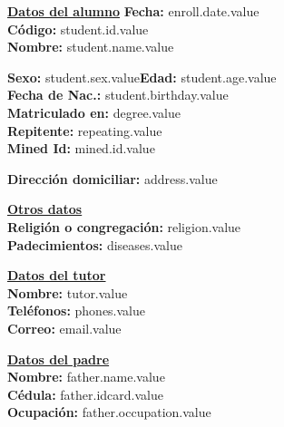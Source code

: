 \documentclass[12pt]{article}
\newcommand{\aField}[1]{#1}
\newcommand{\enrollDate}{enroll.date.value}
\newcommand{\studentName}{student.name.value}
\newcommand{\studentBirthday}{student.birthday.value}
\newcommand{\studentAge}{student.age.value}
\newcommand{\studentSex}{student.sex.value}
\newcommand{\isRepeating}{repeating.value}
\newcommand{\minedId}{mined.id.value}
\newcommand{\degree}{degree.value}
\newcommand{\address}{address.value}
\newcommand{\religion}{religion.value}
\newcommand{\diseases}{diseases.value}
\newcommand{\tutor}{tutor.value}
\newcommand{\phones}{phones.value}
\newcommand{\email}{email.value}
\newcommand{\fatherName}{father.name.value}
\newcommand{\fatherIdcard}{father.idcard.value}
\newcommand{\fatherOccupation}{father.occupation.value}
\newcommand{\studentId}{student.id.value}
\begin{document}
    \textbf{\uline{Datos del alumno}} \hfill \textbf{Fecha:} \enrollDate\\[1mm]
    \textbf{Código:} \aField{\studentId}\\
    \textbf{Nombre:} \aField{\studentName}
    \par\vspace{1mm}
    \begin{minipage}[t]{0.49\textwidth}
        \textbf{Sexo:} \aField{\studentSex}\hspace{6mm}\textbf{Edad:} \aField{\studentAge}\\
        \textbf{Fecha de Nac.:} \aField{\studentBirthday}\\
        \textbf{Matriculado en:} \aField{\degree}\\
        \textbf{Repitente:} \aField{\isRepeating}\\
        \textbf{Mined Id:} \aField{\minedId}
    \end{minipage}
    \hfill
    \begin{minipage}[t]{0.49\textwidth}
        \textbf{Dirección domiciliar:} \aField{\address}
    \end{minipage}
    \par\vspace{4mm}
    \begin{minipage}[t]{0.49\textwidth}
        \textbf{\uline{Otros datos}}\\[1mm]
        \textbf{Religión o congregación:} \aField{\religion}\\
        \textbf{Padecimientos:} \aField{\diseases}
    \end{minipage}
    \hfill
    \begin{minipage}[t]{0.49\textwidth}
        \textbf{\uline{Datos del tutor}}\\[1mm]
        \textbf{Nombre:} \aField{\tutor}\\
        \textbf{Teléfonos:} \aField{\phones}\\
        \textbf{Correo:} \aField{\email}
    \end{minipage}
    \par\vspace{4mm}
    \begin{minipage}[t]{0.49\textwidth}
        \textbf{\uline{Datos del padre}}\\[1mm]
        \textbf{Nombre:} \aField{\fatherName}\\
        \textbf{Cédula:} \aField{\fatherIdcard}\\
        \textbf{Ocupación:} \aField{\fatherOccupation}
    \end{minipage}
\end{document}
